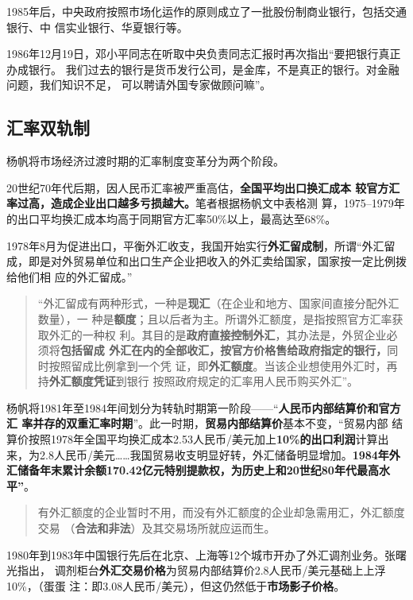 1985年后，中央政府按照市场化运作的原则成立了一批股份制商业银行，包括交通银行、中
信实业银行、华夏银行等。

1986年12月19日，邓小平同志在听取中央负责同志汇报时再次指出“要把银行真正办成银行。
我们过去的银行是货币发行公司，是金库，不是真正的银行。对金融问题，我们知识不足，
可以聘请外国专家做顾问嘛”。


\subsection{汇率双轨制}

杨帆将市场经济过渡时期的汇率制度变革分为两个阶段。\cite{huilvshi}

20世纪70年代后期，因人民币汇率被严重高估，\textbf{全国平均出口换汇成本
  较官方汇率过高，造成企业出口越多亏损越大。}笔者根据杨帆文中表格测
算，1975--1979年的出口平均换汇成本均高于同期官方汇率50\%以上，最高达至68\%。

1978年8月为促进出口，平衡外汇收支，我国开始实行\textbf{外汇留成制}，所谓“外汇留
成，即是对外贸易单位和出口生产企业把收入的外汇卖给国家，国家按一定比例拨给他们相
应的外汇留成。”

\begin{quotation}
  “外汇留成有两种形式，一种是\textbf{现汇}（在企业和地方、国家间直接分配外汇数量），一
  种是\textbf{额度}；且以后者为主。所谓外汇额度，是指按照官方汇率获取外汇的一种权
  利。其目的是\textbf{政府直接控制外汇}，其办法是，外贸企业必须将\textbf{包括留成
    外汇在内的全部收汇，按官方价格售给政府指定的银行，}同时按照留成比例拿到一个凭
  证，即\textbf{外汇额度}。当该企业想使用外汇时，再持\textbf{外汇额度凭证}到银行
  按照政府规定的汇率用人民币购买外汇”。
\end{quotation}


杨帆将1981年至1984年间划分为转轨时期第一阶段——“\textbf{人民币内部结算价和官方汇
  率并存的双重汇率时期}”。此一时期，\textbf{贸易内部结算价}基本不变，“贸易内部
结算价按照1978年全国平均换汇成本2.53人民币/美元加上\textbf{10\%的出口利润}计算出
来，为2.8人民币/美元……我国贸易收支明显好转，外汇储备明显增加。\textbf{1984年外
  汇储备年末累计余额170.42亿元特别提款权，为历史上和20世纪80年代最高水平”}。

\begin{quotation}
  有外汇额度的企业暂时不用，而没有外汇额度的企业却急需用汇，外汇额度交易
  （\textbf{合法和非法}）及其交易场所就应运而生。
\end{quotation}

1980年到1983年中国银行先后在北京、上海等12个城市开办了外汇调剂业务。张曙光指出，
调剂柜台\textbf{外汇交易价格}为贸易内部结算价2.8人民币/美元基础上上浮10\%，（蛋蛋
注：即3.08人民币/美元），但这仍然低于\textbf{市场影子价格}。

